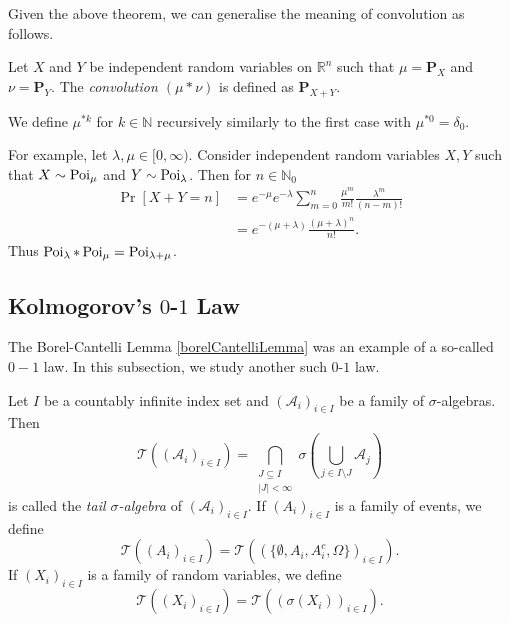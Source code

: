 Given the above theorem, we can generalise the meaning of convolution as follows.

\begin{definition}
    Let $X$ and $Y$ be independent random variables on $\mathbb{R}^n$ such that $\mu=\textbf{P}_X$ and $\nu=\textbf{P}_Y$. The \textit{convolution $(\mu * \nu)$} is defined as $\textbf{P}_{X+Y}$.
\end{definition}

We define $\mu^{*k}$ for $k\in\mathbb{N}$ recursively similarly to the first case with $\mu^{*0}=\delta_0$.

\vspace{2mm}
For example, let $\lambda,\mu\in[0,\infty)$. Consider independent random variables $X,Y$ such that $X\sim\operatorname{Poi}_\mu$ and $Y\sim\operatorname{Poi}_\lambda$. Then for $n\in\mathbb{N}_0$
\begin{align*}
    \Pr[X+Y=n] &= e^{-\mu}e^{-\lambda}\sum_{m=0}^n \frac{\mu^m}{m!}\frac{\lambda^m}{(n-m)!} \\
    &= e^{-(\mu+\lambda)}\frac{(\mu+\lambda)^n}{n!}.
\end{align*}
Thus $\operatorname{Poi}_\lambda * \operatorname{Poi}_\mu = \operatorname{Poi}_{\lambda+\mu}$.

\subsection{Kolmogorov's \texorpdfstring{$0$}{TEXT}-\texorpdfstring{$1$}{TEXT} Law}

The Borel-Cantelli Lemma \ref{borelCantelliLemma} was an example of a so-called $0-1$ law. In this subsection, we study another such $0$-$1$ law.

\begin{definition}
    Let $I$ be a countably infinite index set and $(\mathcal{A}_i)_{i\in I}$ be a family of $\sigma$-algebras. Then
    $$\mathcal{T}((\mathcal{A}_i)_{i\in I})=\bigcap_{\substack{J\subseteq I \\ |J|<\infty}} \sigma\left(\bigcup_{j\in I\setminus J}\mathcal{A}_j\right)$$
    is called the \textit{tail $\sigma$-algebra} of $(\mathcal{A}_i)_{i\in I}$. If $(A_i)_{i\in I}$ is a family of events, we define
    $$\mathcal{T}((A_i)_{i\in I}) = \mathcal{T}((\{\emptyset,A_i,A_i^c,\Omega\})_{i\in I}).$$
    If $(X_i)_{i\in I}$ is a family of random variables, we define
    $$\mathcal{T}((X_i)_{i\in I}) = \mathcal{T}((\sigma(X_i))_{i\in I}).$$
\end{definition}

